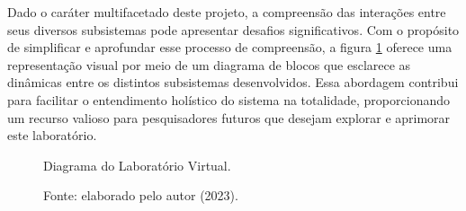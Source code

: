 Dado o caráter multifacetado deste projeto, a compreensão das interações entre seus diversos subsistemas pode apresentar desafios significativos. Com o propósito de simplificar e aprofundar esse processo de compreensão, a figura \ref{fig3:image_17} oferece uma representação visual por meio de um diagrama de blocos que esclarece as dinâmicas entre os distintos subsistemas desenvolvidos. Essa abordagem contribui para facilitar o entendimento holístico do sistema na totalidade, proporcionando um recurso valioso para pesquisadores futuros que desejam explorar e aprimorar este laboratório.


\begin{figure}[!h]
	\centering
	\caption{Diagrama do Laboratório Virtual.}
	\caption*{Fonte: elaborado pelo autor (2023).}
	\label{fig3:image_17}
\end{figure}
